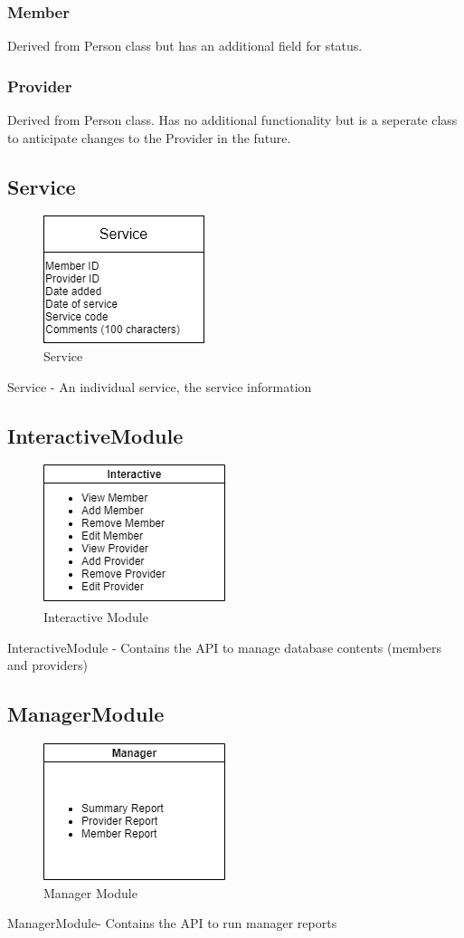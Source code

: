 \documentclass{article}
\begin{document}
\subsubsection{Member}
Derived from Person class but has an additional field for status.
\subsubsection{Provider}
Derived from Person class. Has no additional functionality but is a seperate class to anticipate changes to the Provider in the future.

\subsection{Service}
  \begin{figure}[h!]
	\centering
	\includegraphics[width=0.3\linewidth]{service.png}
	\caption[Service]{Service}
	\label{fig:P1compileP0-1}
  \end{figure}
Service - An individual service, the service information

\subsection{InteractiveModule}
  \begin{figure}[h!]
	\centering
	\includegraphics[width=0.3\linewidth]{interactiveModule.png}
	\caption[Interactive Module]{Interactive Module}
	\label{fig:P1compileP0-1}
  \end{figure}
InteractiveModule - Contains the API to manage database contents (members and providers)

\pagebreak
\subsection{ManagerModule}
  \begin{figure}[h!]
	\centering
	\includegraphics[width=0.3\linewidth]{managerModule.png}
	\caption[Manager Module]{Manager Module}
	\label{fig:P1compileP0-1}
  \end{figure}
ManagerModule- Contains the API to run manager reports
\end{document}
